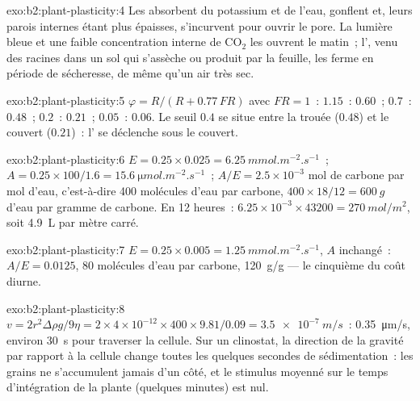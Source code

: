\begin{solution}{exo:b2:plant-plasticity:4}
Les  absorbent du potassium et de l'eau, gonflent et,
leurs parois internes étant plus épaisses, s'incurvent pour ouvrir le
pore. La lumière bleue et une faible concentration interne de
$\mathrm{CO_2}$ les ouvrent le matin~; l', venu des
racines dans un sol qui s'assèche ou produit par la feuille, les ferme
en période de sécheresse, de même qu'un air très sec.
\end{solution}

\begin{solution}{exo:b2:plant-plasticity:5}
$\varphi = R/(R + 0.77\,FR)$ avec $FR = 1$~: $1.15$~: $0.60$~; $0.7$~:
$0.48$~; $0.2$~: $0.21$~; $0.05$~: $0.06$. Le seuil $0.4$ se situe entre
la trouée ($0.48$) et le couvert ($0.21$)~: l' se
déclenche sous le couvert.
\end{solution}

\begin{solution}{exo:b2:plant-plasticity:6}
$E = 0.25\times 0.025 = \qty{6.25}{mmol.m^{-2}.s^{-1}}$~; $A =
0.25\times 100/1.6 = \qty{15.6}{\micro mol.m^{-2}.s^{-1}}$~; $A/E =
2.5\times 10^{-3}$ mol de carbone par mol d'eau, c'est-à-dire
400 molécules d'eau par carbone, $400\times 18/12 = \qty{600}{g}$ d'eau
par gramme de carbone. En 12 heures~: $6.25\times 10^{-3}\times 43200 =
\qty{270}{mol/m^2}$, soit \qty{4.9}{L} par mètre carré.
\end{solution}

\begin{solution}{exo:b2:plant-plasticity:7}
$E = 0.25\times 0.005 = \qty{1.25}{mmol.m^{-2}.s^{-1}}$, $A$ inchangé~:
$A/E = 0.0125$, 80 molécules d'eau par carbone, \qty{120}{g/g} --- le
cinquième du coût diurne.
\end{solution}

\begin{solution}{exo:b2:plant-plasticity:8}
$v = 2r^{2}\Delta\rho g/9\eta = 2\times 4\times 10^{-12}\times
400\times 9.81/0.09 = \qty{3.5e-7}{m/s}$~: \qty{0.35}{\micro m/s},
environ \qty{30}{s} pour traverser la cellule. Sur un clinostat, la
direction de la gravité par rapport à la cellule change toutes les
quelques secondes de sédimentation~: les grains ne s'accumulent jamais
d'un côté, et le stimulus moyenné sur le temps d'intégration de la
plante (quelques minutes) est nul.
\end{solution}

